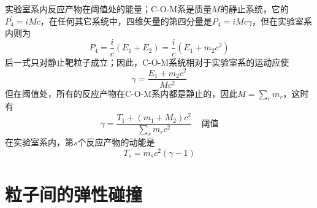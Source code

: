 \documentclass[11pt,a4paper]{article}
\begin{document}
实验室系内反应产物在阈值处的能量；C-O-M系是质量$M$的静止系统，它的$P^{\prime}_4 = i M c$，在任何其它系统中，四维矢量的第四分量是$P_4 = i M c \gamma$，但在实验室系内则为
\begin{equation}
P_4 = \frac{i}{c} (E_1 +E_2) = \frac{i}{c} (E_1 +m_2 c^2)
\end{equation}
后一式只对静止靶粒子成立；因此，C-O-M系统相对于实验室系的运动应使
\begin{equation}
\gamma = \frac{E_1 +m_2 c^2}{Mc^2}
\end{equation}
但在阈值处，所有的反应产物在C-O-M系内都是静止的，因此$M = \sum\limits_r m_r$，这时有
\begin{equation}
\gamma = \frac{T_1 +(m_1 +M_2) c^2}{\sum\limits_r m_r c^2}   ~~~~~\text{阈值}
\end{equation}
在实验室系内，第$s$个反应产物的动能是
\begin{equation}
T_s = m_s c^2 (\gamma -1)
\end{equation}




\section{粒子间的弹性碰撞}
\end{document}
